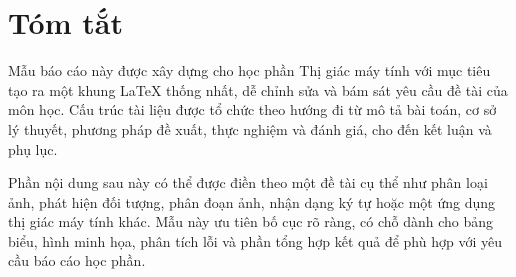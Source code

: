 \chapter*{Tóm tắt}

Mẫu báo cáo này được xây dựng cho học phần Thị giác máy tính với mục tiêu tạo ra một khung LaTeX thống nhất, dễ chỉnh sửa và bám sát yêu cầu đề tài của môn học. Cấu trúc tài liệu được tổ chức theo hướng đi từ mô tả bài toán, cơ sở lý thuyết, phương pháp đề xuất, thực nghiệm và đánh giá, cho đến kết luận và phụ lục.

Phần nội dung sau này có thể được điền theo một đề tài cụ thể như phân loại ảnh, phát hiện đối tượng, phân đoạn ảnh, nhận dạng ký tự hoặc một ứng dụng thị giác máy tính khác. Mẫu này ưu tiên bố cục rõ ràng, có chỗ dành cho bảng biểu, hình minh họa, phân tích lỗi và phần tổng hợp kết quả để phù hợp với yêu cầu báo cáo học phần.
